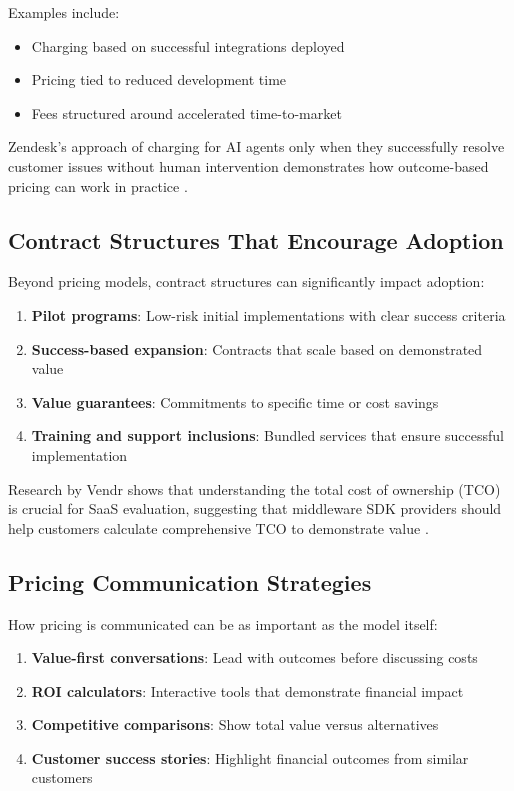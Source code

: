 \documentclass[11pt,a4paper]{article}
\begin{document}
Examples include:
\begin{itemize}
    \item Charging based on successful integrations deployed
    \item Pricing tied to reduced development time
    \item Fees structured around accelerated time-to-market
\end{itemize}

Zendesk's approach of charging for AI agents only when they successfully resolve customer issues without human intervention demonstrates how outcome-based pricing can work in practice \citep{deGoei2025OutcomeBasedPricing}.

\subsection{Contract Structures That Encourage Adoption}

Beyond pricing models, contract structures can significantly impact adoption:

\begin{enumerate}
    \item \textbf{Pilot programs}: Low-risk initial implementations with clear success criteria
    \item \textbf{Success-based expansion}: Contracts that scale based on demonstrated value
    \item \textbf{Value guarantees}: Commitments to specific time or cost savings
    \item \textbf{Training and support inclusions}: Bundled services that ensure successful implementation
\end{enumerate}

Research by Vendr shows that understanding the total cost of ownership (TCO) is crucial for SaaS evaluation, suggesting that middleware SDK providers should help customers calculate comprehensive TCO to demonstrate value \citep{VendrTeam2023}.

\subsection{Pricing Communication Strategies}

How pricing is communicated can be as important as the model itself:

\begin{enumerate}
    \item \textbf{Value-first conversations}: Lead with outcomes before discussing costs
    \item \textbf{ROI calculators}: Interactive tools that demonstrate financial impact
    \item \textbf{Competitive comparisons}: Show total value versus alternatives
    \item \textbf{Customer success stories}: Highlight financial outcomes from similar customers
\end{enumerate}
\end{document}
